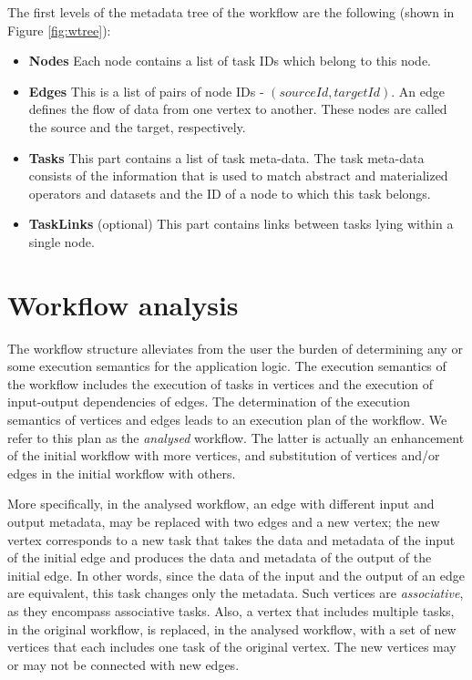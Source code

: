 \documentclass[12pt,openany,onecolumn]{book}
\begin{document}
The first levels of the metadata tree of the workflow are the following (shown in Figure \ref{fig:wtree}):
\begin{itemize}
\item \textbf{Nodes} Each node contains a list of task IDs which belong to this node.
\item \textbf{Edges} This is a list of pairs of node IDs - $(sourceId, targetId)$. An edge defines the flow of data from one vertex to another. These nodes are called the source and the target, respectively.
\item \textbf{Tasks} This part contains a list of task meta-data. The task meta-data consists of the information that is used to match abstract and materialized operators and datasets and the ID of a node to which this task belongs.
\item \textbf{TaskLinks} (optional) This part contains links between tasks lying within a single node.
\end{itemize}

\section{Workflow analysis}\label{sec:analysis}
The workflow structure alleviates from the user the burden of determining any or some execution semantics for the application logic. The execution semantics of the workflow includes the execution of tasks in vertices and the execution of input-output dependencies of edges. The determination of the execution semantics of vertices and edges leads to an execution plan of the workflow. We refer to this plan as the \emph{analysed} workflow. The latter is actually an enhancement of the initial workflow with more vertices, and substitution of vertices and/or edges in the initial workflow with others. 

More specifically, in the analysed workflow, an edge with different input and output metadata, may be replaced with two edges 
and a new vertex; the new vertex corresponds to a new task that takes the data and metadata of the input of the initial edge and produces the data and metadata of the output of the initial edge. In other words, since the data of the input and the output of an edge are equivalent, this task changes only the metadata. Such vertices are \emph{associative}, as they encompass associative tasks.
Also, a vertex that includes multiple tasks, in the original workflow, is replaced, in the analysed workflow, with a set of new vertices that each includes one task of the original vertex. The new vertices may or may not be connected with new edges.
\end{document}
